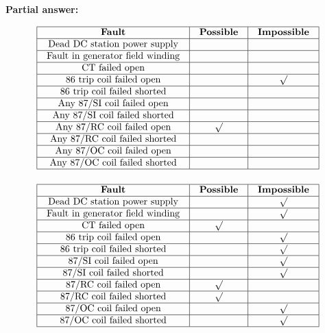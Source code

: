 





\noindent
{\bf Partial answer:}


$$\vbox{\offinterlineskip
\halign{\strut
\vrule \quad\hfil # \ \hfil & 
\vrule \quad\hfil # \ \hfil & 
\vrule \quad\hfil # \ \hfil \vrule \cr
\noalign{\hrule}
%
{\bf Fault} & {\bf Possible} & {\bf Impossible} \cr
%
\noalign{\hrule}
%
Dead DC station power supply &  &  \cr
%
\noalign{\hrule}
%
Fault in generator field winding &  &  \cr
%
\noalign{\hrule}
%
CT failed open &  &  \cr
%
\noalign{\hrule}
%
86 trip coil failed open &  & $\surd$ \cr
%
\noalign{\hrule}
%
86 trip coil failed shorted &  &  \cr
%
\noalign{\hrule}
%
Any 87/SI coil failed open &  &  \cr
%
\noalign{\hrule}
%
Any 87/SI coil failed shorted &  &  \cr
%
\noalign{\hrule}
%
Any 87/RC coil failed open & $\surd$ &  \cr
%
\noalign{\hrule}
%
Any 87/RC coil failed shorted &  &  \cr
%
\noalign{\hrule}
%
Any 87/OC coil failed open &  &  \cr
%
\noalign{\hrule}
%
Any 87/OC coil failed shorted &  &  \cr
%
\noalign{\hrule}
} %
}$$ %
 







$$\vbox{\offinterlineskip
\halign{\strut
\vrule \quad\hfil # \ \hfil & 
\vrule \quad\hfil # \ \hfil & 
\vrule \quad\hfil # \ \hfil \vrule \cr
\noalign{\hrule}
%
{\bf Fault} & {\bf Possible} & {\bf Impossible} \cr
%
\noalign{\hrule}
%
Dead DC station power supply &  & $\surd$ \cr
%
\noalign{\hrule}
%
Fault in generator field winding &  & $\surd$ \cr
%
\noalign{\hrule}
%
CT failed open & $\surd$ &  \cr
%
\noalign{\hrule}
%
86 trip coil failed open &  & $\surd$ \cr
%
\noalign{\hrule}
%
86 trip coil failed shorted &  & $\surd$ \cr
%
\noalign{\hrule}
%
87/SI coil failed open &  & $\surd$ \cr
%
\noalign{\hrule}
%
87/SI coil failed shorted &  & $\surd$ \cr
%
\noalign{\hrule}
%
87/RC coil failed open & $\surd$ &  \cr
%
\noalign{\hrule}
%
87/RC coil failed shorted & $\surd$ &  \cr
%
\noalign{\hrule}
%
87/OC coil failed open &  & $\surd$ \cr
%
\noalign{\hrule}
%
87/OC coil failed shorted &  & $\surd$ \cr
%
\noalign{\hrule}
} %
}$$ %




